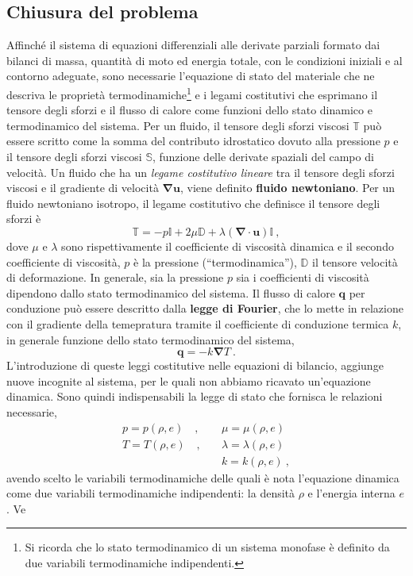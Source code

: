 \subsection{Chiusura del problema}
Affinché il sistema di equazioni differenziali alle derivate parziali formato dai bilanci di massa, quantità di moto ed energia totale, con le condizioni iniziali e al contorno adeguate, sono necessarie l'equazione di stato del materiale che ne descriva le proprietà termodinamiche\footnote{Si ricorda che lo stato termodinamico di un sistema monofase è definito da due variabili termodinamiche indipendenti.} e i legami costitutivi che esprimano il tensore degli sforzi e il flusso di calore come funzioni dello stato dinamico e termodinamico del sistema.
Per un fluido, il tensore degli sforzi viscosi $\mathbb{T}$ può essere scritto come la somma del contributo idrostatico dovuto alla pressione $p$ e il tensore degli sforzi viscosi $\mathbb{S}$, funzione delle derivate spaziali del campo di velocità. Un fluido che ha un \textit{legame costitutivo lineare} tra il tensore degli sforzi viscosi e il gradiente di velocità $\bm{\nabla} \bm{u}$, viene definito \textbf{fluido newtoniano}. Per un fluido newtoniano isotropo, il legame costitutivo che definisce il tensore degli sforzi è
\begin{equation}
 \mathbb{T} = -p \mathbb{I} + 2 \mu \mathbb{D} + \lambda (\bm{\nabla} \cdot \bm{u}) \mathbb{I} \ ,
\end{equation}
dove $\mu$ e $\lambda$ sono rispettivamente il coefficiente di viscosità dinamica e il secondo coefficiente di viscosità, $p$ è  la pressione (``termodinamica''), $\mathbb{D}$ il tensore velocità di deformazione. In generale, sia la pressione $p$ sia i coefficienti di viscosità dipendono dallo stato termodinamico del sistema. \newline
Il flusso di calore $\bm{q}$ per conduzione può essere descritto dalla \textbf{legge di Fourier}, che lo mette in relazione con il gradiente della temepratura tramite il coefficiente di conduzione termica $k$, in generale funzione dello stato termodinamico del sistema,
\begin{equation}
 \bm{q} = - k \bm{\nabla} T \ .
\end{equation}
L'introduzione di queste leggi costitutive nelle equazioni di bilancio, aggiunge nuove incognite  al sistema, per le quali non abbiamo ricavato un'equazione dinamica. Sono quindi indispensabili la legge di stato che fornisca le relazioni necessarie,
\begin{equation}
 \begin{aligned}
  p = p(\rho,e) \quad , & \quad \mu = \mu(\rho,e) \\
  T = T(\rho,e) \quad , & \quad \lambda = \lambda(\rho,e) \\
  & \quad k = k(\rho,e) \ ,
 \end{aligned}
\end{equation}
avendo scelto le variabili termodinamiche delle quali è nota l'equazione dinamica come due variabili termodinamiche indipendenti: la densità $\rho$ e l'energia interna $e$. Ve


